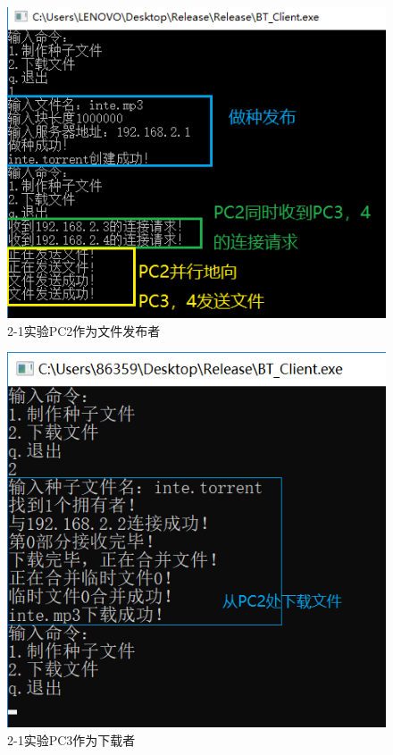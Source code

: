 \documentclass[thesis]{thesis}
\begin{document}
	\begin{minipage}{0.5\linewidth}
	\begin{figure}[H]
		\centering
		\includegraphics[width=\linewidth]{fig/PC2_12.png}
		\caption{2-1实验\quad PC2作为文件发布者}
		\label{res:PC2_12}
	\end{figure}
	\end{minipage}
	\begin{minipage}{0.5\linewidth}
	\begin{figure}[H]
		\centering
		\includegraphics[width=0.9\linewidth]{fig/PC3_12.png}
		\caption{2-1实验\quad PC3作为下载者}
		\label{res:PC3_12}
	\end{figure}
	\end{minipage}
\end{document}

